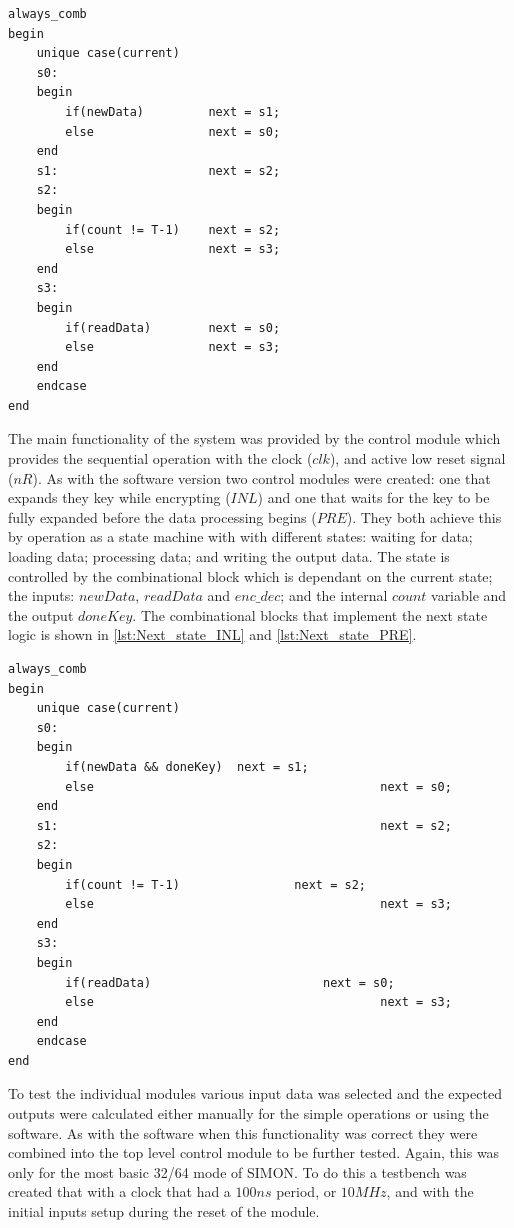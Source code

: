 \documentclass[12pt,twoside,a4paper]{report}
\begin{document}
	\begin{minipage}{\linewidth}
	\begin{lstlisting}[label={lst:Next_state_INL},caption={The next state logic for the ($INL$) control module},style=SVStyle]
always_comb
begin
	unique case(current)
	s0:
	begin
		if(newData)			next = s1;
		else				next = s0;
	end
	s1:						next = s2;
	s2:
	begin
		if(count != T-1)	next = s2;
		else				next = s3;
	end
	s3:
	begin
		if(readData)		next = s0;
		else				next = s3;
	end
	endcase
end
	\end{lstlisting}
	\end{minipage}
	
        The main functionality of the system was provided by the control module which provides the sequential operation with the clock ($clk$), and active low reset signal ($nR$). As with the software version two control modules were created: one that expands they key while encrypting ($INL$) and one that waits for the key to be fully expanded before the data processing begins ($PRE$). They both achieve this by operation as a state machine with with different states: waiting for data; loading data; processing data; and writing the output data. The state is controlled by the combinational block which is dependant on the current state; the inputs: $newData$, $readData$ and $enc\_dec$; and the internal $count$ variable and the output $doneKey$. The combinational blocks that implement the next state logic is shown in \autoref{lst:Next_state_INL} and \ref{lst:Next_state_PRE}.

	\begin{minipage}{\linewidth}
	\begin{lstlisting}[label={lst:Next_state_PRE},caption={The next state logic for the ($PRE$) control module},style=SVStyle]	
always_comb
begin
	unique case(current)
	s0:
	begin
		if(newData && doneKey)	next = s1;
		else										next = s0;
	end
	s1:												next = s2;
	s2:
	begin
		if(count != T-1)				next = s2;
		else										next = s3;
	end
	s3:
	begin
		if(readData)						next = s0;
		else										next = s3;
	end
	endcase
end
	\end{lstlisting}
	\end{minipage}
	
	To test the individual modules various input data was selected and the expected outputs were calculated either manually for the simple operations or using the software. As with the software when this functionality was correct they were combined into the top level control module to be further tested. Again, this was only for the most basic 32/64 mode of SIMON. To do this a testbench was created that with a clock that had a $100ns$ period, or $10MHz$, and with the initial inputs setup during the reset of the module. 
	
\end{document}
